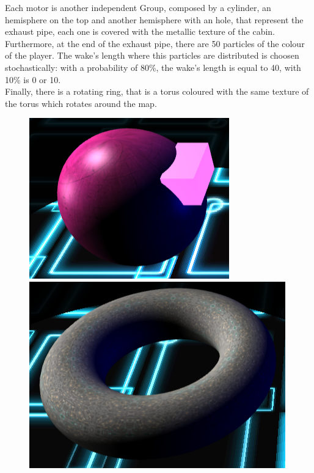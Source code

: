 \documentclass[11pt]{article}
\begin{document}
	Each motor is another independent Group, composed by a cylinder, an hemisphere on the top and another hemisphere with an hole, that represent the exhaust pipe, each one is covered with the metallic texture of the cabin.
	Furthermore, at the end of the exhaust pipe, there are 50 particles of the colour of the player. The wake's length where this particles are distributed is choosen stochastically: with a probability of 80\%, the wake's length is equal to 40, with 10\% is 0 or 10.\\
	
	Finally, there is a rotating ring, that is a torus coloured with the same texture of the torus which rotates around the map.
	
	\begin{figure}
		\centering
		\begin{minipage}[b]{0.25\linewidth}
			\includegraphics[width=\linewidth]{cabin}
			\caption{}
			\label{fig:cabin}
		\end{minipage}
		\begin{minipage}[b]{0.276\linewidth}
			\includegraphics[width=\linewidth]{toro}

\end{minipage}
\end{figure}
\end{document}
